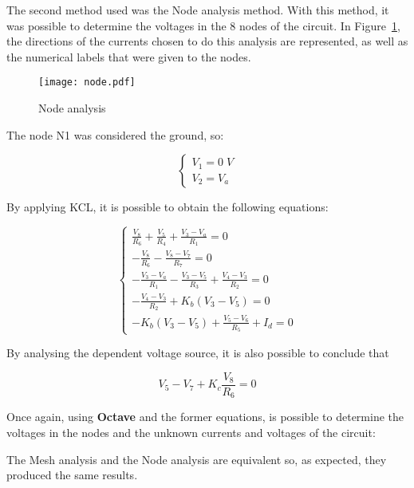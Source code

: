 The second method used was the Node analysis method. With this method, it was possible to determine the voltages in the 8 nodes of the circuit. In Figure~\ref{node_fig}, the directions of the currents chosen to do this analysis are represented, as well as the numerical labels that were given to the nodes.

\begin{figure}[H]
  \centering
  \texttt{[image: node.pdf]}
  \caption{Node analysis}
  \label{node_fig}
\end{figure}

The node N1 was considered the ground, so:

\begin{equation}
  \begin{cases}
    V_1 = 0 \; V \\
    V_2 = V_a
  \end{cases}
\end{equation}

By applying KCL, it is possible to obtain the following equations:

\begin{equation}
  \begin{cases}
    \frac{V_8}{R_6} + \frac{V_5}{R_4} + \frac{V_3-V_a}{R_1} = 0 \\
    -\frac{V_8}{R_6} - \frac{V_8-V_7}{R_7} = 0 \\
    -\frac{V_3-V_a}{R_1} - \frac{V_3-V_5}{R_3} + \frac{V_4-V_3}{R_2} = 0 \\
    -\frac{V_4-V_3}{R_2} + K_b(V_3-V_5) = 0 \\
    -K_b(V_3-V_5) + \frac{V_5-V_6}{R_5} + I_d = 0
  \end{cases}
\end{equation}

By analysing the dependent voltage source, it is also possible to conclude that

\begin{equation}
  V_5 - V_7 + K_c\frac{V_8}{R_6} = 0
\end{equation}

\newpage

Once again, using {\bf Octave} and the former equations, is possible to determine the voltages in the nodes and the unknown currents and voltages of the circuit:

The Mesh analysis and the Node analysis are equivalent so, as expected, they produced the same results.


